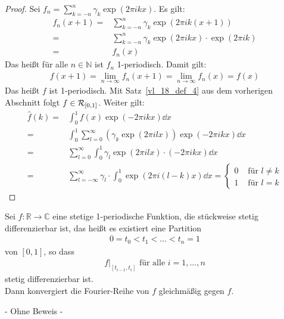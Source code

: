 \begin{proof}
	Sei $f_n = \sum_{k=-n}^n \gamma_k \exp(2\pi ikx)$. Es gilt:
	\begin{align*}
		f_n(x+1) = & \sum_{k = -n}^n \gamma_k \exp(2\pi i k (x+1)) \\
		= & \sum_{k = -n}^n \gamma_k \exp(2 \pi i k x) \cdot \exp(2 \pi i k)
		\\ = & f_n(x)
	\end{align*}		
	Das heißt für alle $n \in \mathbb{N}$ ist $f_n$ 1-periodisch.
	Damit gilt:
	\begin{align*}
	f(x+1) = \lim\limits_{n \rightarrow \infty} f_n(x+1) 
		= \lim\limits_{n \rightarrow \infty} f_n(x) = f(x)
	\end{align*}		
	Das heißt $f$ ist 1-periodisch. Mit Satz~\ref{vl_18_def_4} 
	 aus dem vorherigen 
	Abschnitt folgt $f \in \mathcal{R}_{[{0},{1}]}$. Weiter gilt:
	\begin{align*}
	\hat{f}(k) = & \int_0^1 f(x) \exp(-2\pi ikx) \dd{x} \\
	= & \int_0^1 \sum_{l=0}^{\infty} 
		\left(\gamma_k \exp(2\pi i lx) 	\right) \exp(-2\pi ikx) \dd{x} \\
	= & \sum_{l=0}^{\infty} \int_0^1 \gamma_l 
		\exp(2\pi i l x) \cdot (-2\pi i k x) \dd{x} \\
	= & \sum_{l = - \infty}^{\infty} \gamma_l \cdot \int_0^1 
		\exp(2\pi i (l-k)x) \dd{x}
	= \begin{cases}
		0 & \text{ für } l \neq k \\
		1 & \text{ für } l = k
		\end{cases}
	\end{align*}
\end{proof}

\begin{Satz}{
	Sei $f: \mathbb{R} \rightarrow \mathbb{C}$ eine stetige 1-periodische Funktion, 
	die stückweise stetig differenzierbar ist, das heißt es existiert eine Partition 
	\begin{align*}
		0 = t_0 < t_1 < \hdots < t_n = 1
	\end{align*}
	von $[0,1]$, so dass 
	\begin{align*}
		f\vert_{[t_{i-1},t_i]} \text{ für alle } i = 1, \hdots, n
	\end{align*}
	stetig differenzierbar ist. \\
	Dann konvergiert die Fourier-Reihe von $f$ gleichmäßig gegen $f$. 
	\begin{center}
		- Ohne Beweis -
	\end{center}
}\end{Satz}

